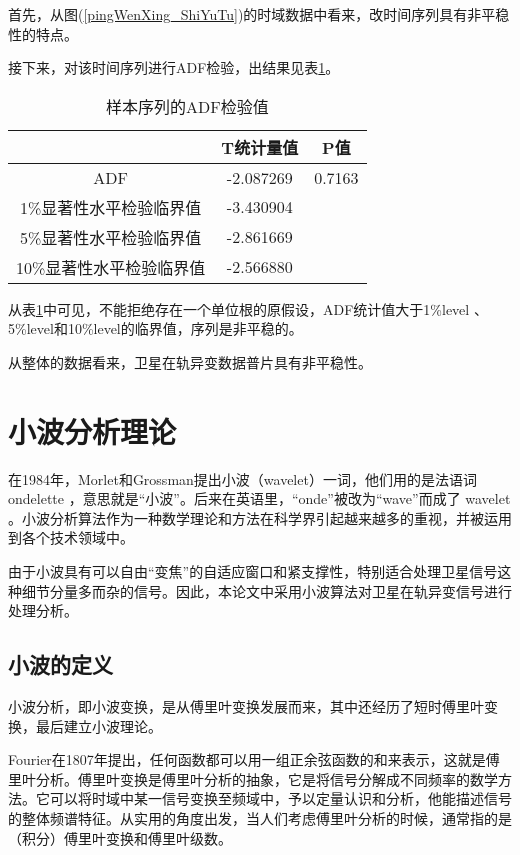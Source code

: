 
首先，从图(\ref{pingWenXing_ShiYuTu})的时域数据中看来，改时间序列具有非平稳性的特点。

接下来，对该时间序列进行ADF检验，出结果见表\ref{tab:pingWenXing_ADF}。
\begin{table}[htbp] 
	\centering
	\caption{\label{tab:pingWenXing_ADF}样本序列的ADF检验值} 
	\begin{tabular}{ccc} 
		\toprule 
		{} & T统计量值 & P值\\ 
		\midrule
		ADF & -2.087269 &  0.7163 \\
		1\%显著性水平检验临界值 & -3.430904 & {}\\ 
		5\%显著性水平检验临界值& -2.861669 & {}\\
		10\%显著性水平检验临界值& -2.566880 & {}\\
		\bottomrule 
	\end{tabular} 
\end{table}

从表\ref{tab:pingWenXing_ADF}中可见，不能拒绝存在一个单位根的原假设，ADF统计值大于1\%level 、 5\%level和10\%level的临界值，序列是非平稳的。

从整体的数据看来，卫星在轨异变数据普片具有非平稳性。

\section{小波分析理论}
在1984年，Morlet和Grossman提出小波（wavelet）一词，他们用的是法语词 ondelette ，意思就是“小波”。后来在英语里，“onde”被改为“wave”而成了 wavelet 。小波分析算法作为一种数学理论和方法在科学界引起越来越多的重视，并被运用到各个技术领域中。

由于小波具有可以自由“变焦”的自适应窗口和紧支撑性，特别适合处理卫星信号这种细节分量多而杂的信号。因此，本论文中采用小波算法对卫星在轨异变信号进行处理分析。

\subsection{小波的定义}
小波分析，即小波变换，是从傅里叶变换发展而来，其中还经历了短时傅里叶变换，最后建立小波理论。

Fourier在1807年提出，任何函数都可以用一组正余弦函数的和来表示，这就是傅里叶分析。傅里叶变换是傅里叶分析的抽象，它是将信号分解成不同频率的数学方法。它可以将时域中某一信号变换至频域中，予以定量认识和分析，他能描述信号的整体频谱特征。从实用的角度出发，当人们考虑傅里叶分析的时候，通常指的是（积分）傅里叶变换和傅里叶级数。

